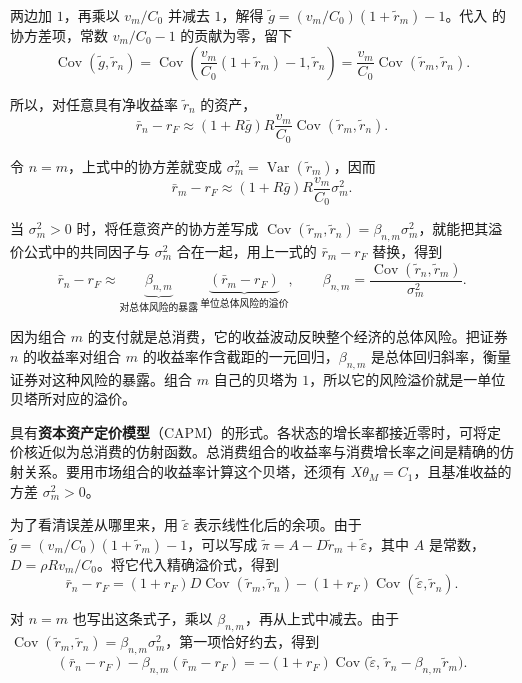 两边加 $1$，再乘以 $v_m/C_0$ 并减去 $1$，解得 $\tilde g=(v_m/C_0)(1+\tilde r_m)-1$。代入 的协方差项，常数 $v_m/C_0-1$ 的贡献为零，留下
\[
 \operatorname{Cov}(\tilde g,\tilde r_n)
 =\operatorname{Cov}\!\left(\frac{v_m}{C_0}(1+\tilde r_m)-1,\tilde r_n\right)
 =\frac{v_m}{C_0}\operatorname{Cov}(\tilde r_m,\tilde r_n).
\]

所以，对任意具有净收益率 $\tilde r_n$ 的资产，
\[
 \bar r_n-r_F\approx
 (1+R\bar g)R\frac{v_m}{C_0}\operatorname{Cov}(\tilde r_m,\tilde r_n).
\]

令 $n=m$，上式中的协方差就变成 $\sigma_m^2=\operatorname{Var}(\tilde r_m)$，因而
\[
 \bar r_m-r_F\approx (1+R\bar g)R\frac{v_m}{C_0}\sigma_m^2.
\]

当 $\sigma_m^2>0$ 时，将任意资产的协方差写成 $\operatorname{Cov}(\tilde r_m,\tilde r_n)=\beta_{n,m}\sigma_m^2$，就能把其溢价公式中的共同因子与 $\sigma_m^2$ 合在一起，用上一式的 $\bar r_m-r_F$ 替换，得到
\begin{equation*}
 \bar r_n-r_F\approx
 \underbrace{\beta_{n,m}}_{\text{对总体风险的暴露}}\,
 \underbrace{(\bar r_m-r_F)}_{\text{单位总体风险的溢价}},\qquad
 \beta_{n,m}=\frac{\operatorname{Cov}(\tilde r_n,\tilde r_m)}{\sigma_m^2}.
 \tag{$**$}\label{eq:wj-10-risk-market-beta}
\end{equation*}

因为组合 $m$ 的支付就是总消费，它的收益波动反映整个经济的总体风险。把证券 $n$ 的收益率对组合 $m$ 的收益率作含截距的一元回归，$\beta_{n,m}$ 是总体回归斜率，衡量证券对这种风险的暴露。组合 $m$ 自己的贝塔为 $1$，所以它的风险溢价就是一单位贝塔所对应的溢价。

具有\textbf{资本资产定价模型}（CAPM）的形式。各状态的增长率都接近零时，可将定价核近似为总消费的仿射函数。总消费组合的收益率与消费增长率之间是精确的仿射关系。要用市场组合的收益率计算这个贝塔，还须有 $X\theta_M=C_1$，且基准收益的方差 $\sigma_m^2>0$。

为了看清误差从哪里来，用 $\tilde\varepsilon$ 表示线性化后的余项。由于 $\tilde g=(v_m/C_0)(1+\tilde r_m)-1$，可以写成 $\widetilde\pi=A-D\tilde r_m+\tilde\varepsilon$，其中 $A$ 是常数，$D=\rho R v_m/C_0$。将它代入精确溢价式，得到
\[
 \bar r_n-r_F=(1+r_F)D\operatorname{Cov}(\tilde r_m,\tilde r_n)
              -(1+r_F)\operatorname{Cov}(\tilde\varepsilon,\tilde r_n).
\]

对 $n=m$ 也写出这条式子，乘以 $\beta_{n,m}$，再从上式中减去。由于 $\operatorname{Cov}(\tilde r_m,\tilde r_n)=\beta_{n,m}\sigma_m^2$，第一项恰好约去，得到
\[
 (\bar r_n-r_F)-\beta_{n,m}(\bar r_m-r_F)
 =-(1+r_F)\operatorname{Cov}\bigl(\tilde\varepsilon,\,
                                    \tilde r_n-\beta_{n,m}\tilde r_m\bigr).
\]

